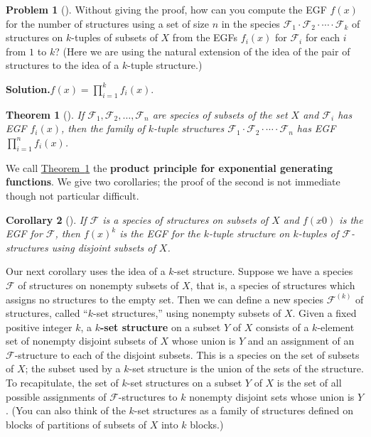 \documentclass[10pt,]{book}
\newcommand{\terminology}[1]{\textbf{#1}}
\theoremstyle{plain}
\newtheorem{theorem}{Theorem}[section]
\newtheorem{corollary}[theorem]{Corollary}
\theoremstyle{definition}
\newtheorem{activity}[project]{Problem}
\theoremstyle{definition}
\numberwithin{equation}{chapter}
\newcommand{\F}{\mathcal{F}}
\begin{document}
\begin{activity}[]\label{genspeciesproduct}
Without giving the proof, how can you compute the EGF \(f(x)\) for the number of structures using a set of size \(n\) in the species \(\F_1\cdot\F_2\cdot \cdots\cdot \F_k\) of structures on \(k\)-tuples of subsets of \(X\) from the EGFs \(f_i(x)\) for \(\F_i\) for each \(i\) from \(1\) to \(k\)?  (Here we are using the natural extension of the idea of the pair of structures to the idea of a \(k\)-tuple structure.)%
\par\medskip\noindent%
\textbf{Solution.}\quad \(f(x) = \prod_{i=1}^k f_i(x)\).%
\end{activity}
\begin{theorem}[{}]\label{genprodprincipleEGF}
If \(\F_1, \F_2, \ldots, \F_n\) are species of subsets of the set \(X\) and \(\F_i\) has EGF \(f_i(x)\), then the family of \(k\)-tuple structures \(\F_1\cdot \F_2\cdot \cdots\cdot \F_n\) has EGF \(\prod_{i=1}^n f_i(x)\).%
\end{theorem}
We call \hyperref[genprodprincipleEGF]{Theorem~\ref{genprodprincipleEGF}} the \terminology{product principle for exponential generating functions}. We give two corollaries; the proof of the second is not immediate though not particular difficult.%
\begin{corollary}[{}]\label{fspeciescorollary1}
If \(\F\) is a species of structures on subsets of \(X\) and \(f(x0)\) is the EGF for \(\F\), then \(f(x)^k\) is the EGF for the \(k\)-tuple structure on \(k\)-tuples of \(\F\)-structures using disjoint subsets of \(X\).%
\end{corollary}
Our next corollary uses the idea of a \(k\)-set structure. Suppose we have a species \(\F\) of structures on nonempty subsets of \(X\), that is, a species of structures which assigns no structures to the empty set. Then we can define a new species \(\F^{(k)}\) of structures, called ``\(k\)-set structures,'' using nonempty subsets of \(X\). Given a fixed positive integer \(k\), a \terminology{\(k\)-set structure} on a subset \(Y\) of \(X\) consists of a \(k\)-element set of nonempty disjoint subsets of \(X\) whose union is \(Y\) and an assignment of an \(\F\)-structure to each of the disjoint subsets. This is a species on the set of subsets of \(X\); the subset used by a \(k\)-set structure is the union of the sets of the structure. To recapitulate, the set of \(k\)-set structures on a subset \(Y\) of \(X\) is the set of all possible assignments of \(\F\)-structures to \(k\) nonempty disjoint sets whose union is \(Y\). (You can also think of the \(k\)-set structures as a family of structures defined on blocks of partitions of subsets of \(X\) into \(k\) blocks.)%
\end{document}
